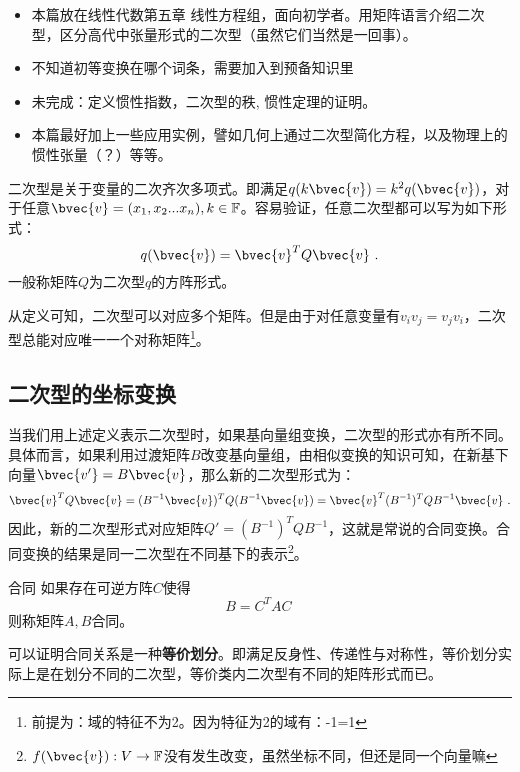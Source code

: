 
\begin{issues}
\issueTODO 
\begin{itemize}
\item 本篇放在线性代数第五章 线性方程组，面向初学者。用矩阵语言介绍二次型，区分高代中张量形式的二次型（虽然它们当然是一回事）。
\item 不知道初等变换在哪个词条，需要加入到预备知识里
\item 未完成：定义惯性指数，二次型的秩, 惯性定理的证明。
\item  本篇最好加上一些应用实例，譬如几何上通过二次型简化方程，以及物理上的惯性张量（？）等等。
\end{itemize}
\end{issues}
\begin{definition}{}
二次型是关于变量的二次齐次多项式。即满足$q(k\bvec{v})=k^2 q(\bvec{v})$，对于任意$\bvec{v}=(x_1,x_2...x_n),k\in \mathbb F$。容易验证，任意二次型都可以写为如下形式：
\begin{equation}
q(\bvec{v})=\bvec{v}^TQ\bvec{v}~.
\end{equation}
一般称矩阵$Q$为二次型$q$的方阵形式。
\end{definition}
从定义可知，二次型可以对应多个矩阵。但是由于对任意变量有$v_iv_j=v_jv_i$，二次型总能对应唯一一个对称矩阵\footnote{前提为：域的特征不为2。因为特征为2的域有：-1=1}。
\subsection{二次型的坐标变换}
当我们用上述定义表示二次型时，如果基向量组变换，二次型的形式亦有所不同。具体而言，如果利用过渡矩阵$B$改变基向量组，由相似变换的知识可知，在新基下向量$\bvec{v'}=B\bvec{v}$，那么新的二次型形式为：
\begin{equation}
\bvec{v}^T Q\bvec{v}=(B^{-1}\bvec{v})^T Q(B^{-1}\bvec{v})=\bvec{v}^T (B^{-1})^{T}QB^{-1}\bvec{v}~.
\end{equation}
因此，新的二次型形式对应矩阵$Q'=(B^{-1})^{T}QB^{-1}$，这就是常说的合同变换。合同变换的结果是同一二次型在不同基下的表示\footnote{$f(\bvec{v}):V\rightarrow \mathbb F$没有发生改变，虽然坐标不同，但还是同一个向量嘛}。
\begin{definition}{合同}
如果存在可逆方阵$C$使得
\begin{equation}
B=C^T AC~
\end{equation}
则称矩阵$A,B$合同。
\end{definition}
可以证明合同关系是一种\textbf{等价划分}。即满足反身性、传递性与对称性，等价划分实际上是在划分不同的二次型，等价类内二次型有不同的矩阵形式而已。

